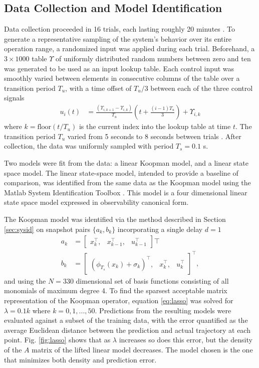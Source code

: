 \subsection{Data Collection and Model Identification}
\label{sec:datacollection}

Data collection proceeded in 16 trials, each lasting roughly 20 minutes .
To generate a representative sampling of the system's behavior over its entire operation range, a randomized input was applied during each trial.
Beforehand, a $3 \times 1000$ table $\Upsilon$ of uniformly distributed random numbers between zero and ten was generated to be used as an input lookup table.
Each control input was smoothly varied between elements in consecutive columns of the table over a transition period $T_u$, with a time offset of $T_u / 3$ between each of the three control signals
\begin{align}
    u_i (t) &= \frac{(\Upsilon_{i,k+1} - \Upsilon_{i,k})}{T_u} \left( t + \frac{(i-1) T_u}{3} \right) + \Upsilon_{i,k}
    \label{eq:input}
\end{align}
where $k = \text{floor}\left( {t} / {T_u} \right)$ is the current index into the lookup table at time $t$. 
The transition period $T_u$ varied from 5 seconds to 8 seconds between trials .
After collection, the data was uniformly sampled with period $T_s = 0.1$ s.

Two models were fit from the data: a linear Koopman model, and a linear state space model.
The linear state-space model, intended to provide a baseline of comparison, was identified from the same data as the Koopman model using the Matlab System Identification Toolbox \cite{MATLAB:2017}.
This model is a four dimensional linear state space model expressed in observability canonical form.

The Koopman model was identified via the method described in Section \ref{sec:sysid} on snapshot pairs $\{ a_k , b_k \}$ incorporating a single delay $d = 1$
\begin{align}
    a_k &= \begin{bmatrix} x_k^\top , & x_{k-1}^\top , & u_{k-1}^\top \end{bmatrix}\top \\
    b_k &= \begin{bmatrix} \left( \phi_{T_s} (x_k) + \sigma_k \right)^\top, & x_{k}^\top, & u_{k}^\top \end{bmatrix}^\top,
\end{align}
and using the $N=330$ dimensional set of basis functions consisting of all monomials of maximum degree 4.
To find the sparsest acceptable matrix representation of the Koopman operator, equation \eqref{eq:lasso} was solved for ${ \lambda = 0.1 k}$ where ${k = 0,1, ... , 50 }$.
Predictions from the resulting models were evaluated against a subset of the training data, with the error quantified as the average Euclidean distance between the prediction and actual trajectory at each point.
Fig. \ref{fig:lasso} shows that as $\lambda$ increases so does this error, but the density of the $A$ matrix of the lifted linear model decreases.
The model chosen is the one that minimizes both density and prediction error.

